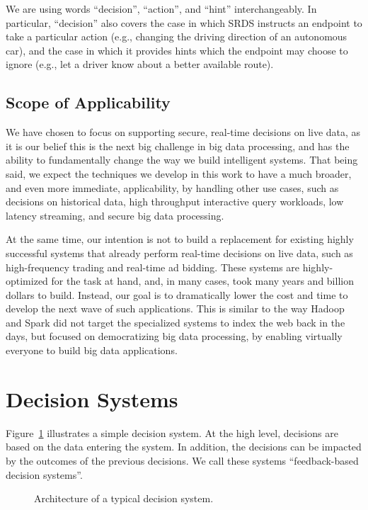 We are using words ``decision'', ``action'', and ``hint'' interchangeably. In particular, “decision” also covers the case in which SRDS instructs an endpoint to take a particular action (e.g., changing the driving direction of an autonomous car), and the case in which it provides hints which the endpoint may choose to ignore (e.g., let a driver know about a better available route).    

\subsection{Scope of Applicability}

We have chosen to focus on supporting secure, real-time decisions on live data, as it is our belief this is the next big challenge in big data processing, and has the ability to fundamentally change the way we build intelligent systems. That being said, we expect the techniques we develop in this work to have a much broader, and even more immediate, applicability, by handling other use cases, such as decisions on historical data, high throughput interactive query workloads, low latency streaming, and secure big data processing.

At the same time, our intention is not to build a replacement for existing highly successful systems that already perform real-time decisions on live data, such as high-frequency trading and real-time ad bidding. These systems are highly-optimized for the task at hand, and, in many cases, took many years and billion dollars to build. Instead, our goal is to dramatically lower the cost and time to develop the next wave of such applications. This is similar to the way Hadoop and Spark did not target the specialized systems to index the web back in the days, but focused on democratizing big data processing, by enabling virtually everyone to build big data applications.

\section{Decision Systems}

Figure~\ref{figure:decision-model} illustrates a simple decision system. At the high level, decisions are based on the data entering the system. In addition, the decisions can be impacted by the outcomes of the previous decisions. We call these systems ``feedback-based decision systems''.

\0
\begin{figure}[h]
 \vskip -0.15in
  \caption{\small{Architecture of a typical decision system.}}
 \label{figure:decision-model}
\end{figure}
 
